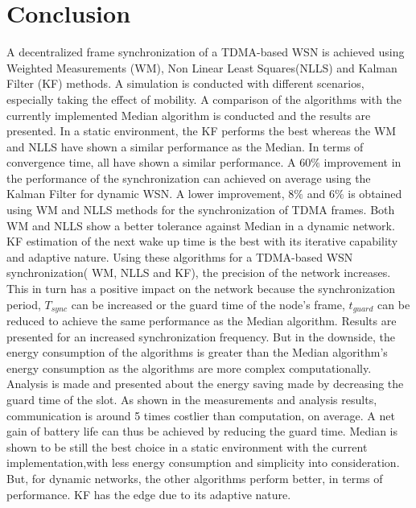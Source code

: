 \documentclass[a4paper,10pt]{report}
\begin{document}
\section{\textbf{Conclusion}}
A decentralized frame synchronization of a TDMA-based WSN is achieved using Weighted Measurements (WM), Non Linear Least Squares(NLLS) and Kalman Filter (KF) methods. A simulation is conducted with different scenarios, especially taking the effect of mobility. A comparison of the algorithms with the currently implemented Median algorithm is conducted and the results are presented.
\newline
In a static environment, the KF performs the best whereas the WM and NLLS have shown a similar performance as the Median. In terms of convergence time, all have shown a similar performance.
\newline
A $60\%$ improvement in the performance of the synchronization can achieved on average using the Kalman Filter for dynamic WSN. A lower improvement, $8\%$ and $6\%$ is obtained using WM and NLLS methods for the synchronization of TDMA frames. Both WM and NLLS show a better tolerance against Median in a dynamic network. KF estimation of the next wake up time is the best with its iterative capability and adaptive nature.
\newline
Using these algorithms for a TDMA-based WSN synchronization( WM, NLLS and KF), the precision of the network increases. This in turn has a positive impact on the network because the synchronization period, $T_{sync}$ can be increased or the guard time of the node's frame, $t_{guard}$ can be reduced to achieve the same performance as the Median algorithm. Results are presented for an increased synchronization frequency.
\newline
But in the downside, the energy consumption of the algorithms is greater than the Median algorithm's energy consumption as the algorithms are more complex computationally. Analysis is made and presented about the energy saving made by decreasing the guard time of the slot. As shown in the measurements and analysis results, communication is around 5 times costlier than computation, on average. A net gain of battery life can thus be achieved by reducing the guard time.
\newline
Median is shown to be still the best choice in a static environment with the current implementation,with less energy consumption and simplicity into consideration. But, for dynamic networks, the other algorithms perform better, in terms of performance. KF has the edge due to its adaptive nature.
\end{document}

